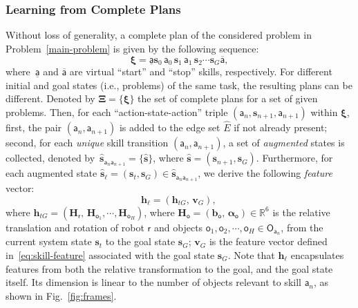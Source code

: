 

\subsubsection{Learning from Complete Plans}\label{subsubsec:gtn-learn}
Without loss of generality, a complete plan of the considered problem in Problem~\ref{main-problem} is given by the following sequence:
\begin{equation}\label{eq:complete-plan}
\boldsymbol{\xi} =\underline{\mathsf{a}} \mathbf{s}_0 \,\mathsf{a}_0\,\mathbf{s}_1 \,\mathsf{a}_1\, \mathbf{s}_2 \cdots \mathbf{s}_G \overline{\mathsf{a}}, 
\end{equation}
where~$\underline{\mathsf{a}}$ and $\overline{\mathsf{a}}$ are virtual ``start'' and ``stop'' skills, respectively.
For different initial and goal states (i.e., problems) of the same task, the resulting plans can be different. 
Denoted by $\boldsymbol{\Xi}=\{\boldsymbol{\xi}\}$ the set of complete plans for a set of given problems.
Then, for each ``action-state-action'' triple $(\mathsf{a}_n, \mathbf{s}_{n+1}, \mathsf{a}_{n+1})$ within $\boldsymbol{\xi}$,
first, the pair $(\mathsf{a}_{n},  \mathsf{a}_{n+1})$ is added to the edge set $\widehat{E}$ if not already present; 
second, for each \emph{unique} skill transition $(\mathsf{a}_{n},\mathsf{a}_{n+1})$, 
a set of \emph{augmented} states is collected, denoted by~$\widehat{\mathbf{s}}_{\mathsf{a}_{n}\mathsf{a}_{n+1}}=\{\widehat{\mathbf{s}}\}$, 
where $\widehat{\mathbf{s}}= (\mathbf{s}_{n+1},\mathbf{s}_G)$.
Furthermore, for each augmented state $\widehat{\mathbf{s}}_\ell=(\mathbf{s}_t,\mathbf{s}_G)\in \widehat{\mathbf{s}}_{\mathsf{a}_{n}\mathsf{a}_{n+1}}$, 
we derive the following \emph{feature} vector:
\begin{equation}\label{eq:edge-feature}
\mathbf{h}_\ell = (\mathbf{h}_{tG},\, \mathbf{v}_G),\,
\end{equation}
where $\mathbf{h}_{tG}=(\boldsymbol{H}_{\mathsf{r}},\,\boldsymbol{H}_{\mathsf{o}_1},\cdots,\boldsymbol{H}_{\mathsf{o}_H})$, 
where $\boldsymbol{H}_{\mathsf{o}}=(\mathbf{b}_{\mathsf{o}},\,\boldsymbol{\alpha}_{\mathsf{o}})\in \mathbb{R}^6$ is the relative translation and rotation of robot $\mathsf{r}$ and objects $\mathsf{o}_1,\mathsf{o}_2,\cdots, \mathsf{o}_H \in \mathsf{O}_{\mathsf{a}_n}$, 
{from} the current system state $\mathbf{s}_t$ {to} the goal state $\mathbf{s}_G$;
$\mathbf{v}_G$ is the feature vector defined in~\eqref{eq:skill-feature} associated with the goal state $\mathbf{s}_G$.
Note that $\mathbf{h}_\ell$ encapsulates features from both the relative transformation to the goal, and the goal state itself. 
Its dimension is linear to the number of objects relevant to skill $\mathsf{a}_{n}$, as shown in Fig.~\ref{fig:frames}.



